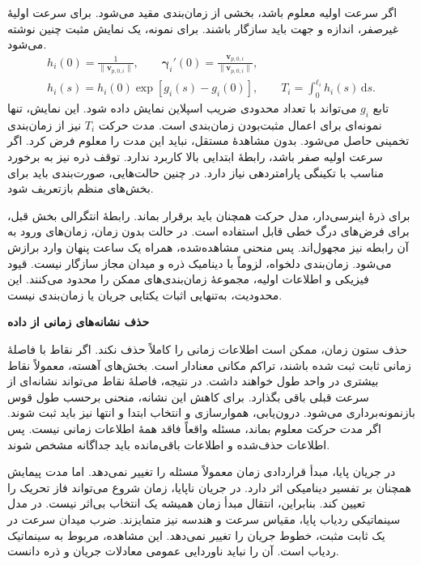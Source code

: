 اگر سرعت اولیه معلوم باشد، بخشی از زمان‌بندی مقید می‌شود.
برای سرعت اولیهٔ غیرصفر، اندازه و جهت باید سازگار باشند.
برای نمونه، یک نمایش مثبت چنین نوشته می‌شود.
\begin{equation}
\begin{gathered}
h_i(0)=\frac{1}{\|\mathbf v_{p,0,i}\|},\qquad
\boldsymbol\gamma_i'(0)=
\frac{\mathbf v_{p,0,i}}{\|\mathbf v_{p,0,i}\|},\\
h_i(s)=h_i(0)\exp\!\left[g_i(s)-g_i(0)\right],\qquad
T_i=\int_0^{\ell_i}h_i(s)\,\mathrm ds.
\end{gathered}
\label{eq:lit-untimed-positive-clock}
\end{equation}
تابع $g_i$ می‌تواند با تعداد محدودی ضریب اسپلاین نمایش داده شود.
این نمایش، تنها نمونه‌ای برای اعمال مثبت‌بودن زمان‌بندی است.
مدت حرکت $T_i$ نیز از زمان‌بندی تخمینی حاصل می‌شود.
بدون مشاهدهٔ مستقل، نباید این مدت را معلوم فرض کرد.
اگر سرعت اولیه صفر باشد، رابطهٔ ابتدایی بالا کاربرد ندارد.
توقف ذره نیز به برخورد مناسب با تکینگی پارامتردهی نیاز دارد.
در چنین حالت‌هایی، صورت‌بندی باید برای بخش‌های منظم بازتعریف شود.

برای ذرهٔ اینرسی‌دار، مدل حرکت همچنان باید برقرار بماند.
رابطهٔ انتگرالی بخش قبل، برای فرض‌های درگ خطی قابل استفاده است.
در حالت بدون زمان، زمان‌های ورود به آن رابطه نیز مجهول‌اند.
پس منحنی مشاهده‌شده، همراه یک ساعت پنهان وارد برازش می‌شود.
زمان‌بندی دلخواه، لزوماً با دینامیک ذره و میدان مجاز سازگار نیست.
قیود فیزیکی و اطلاعات اولیه، مجموعهٔ زمان‌بندی‌های ممکن را محدود می‌کنند.
این محدودیت، به‌تنهایی اثبات یکتایی جریان یا زمان‌بندی نیست.

\textbf{حذف نشانه‌های زمانی از داده}

حذف ستون زمان، ممکن است اطلاعات زمانی را کاملاً حذف نکند.
اگر نقاط با فاصلهٔ زمانی ثابت ثبت شده باشند، تراکم مکانی معنادار است.
بخش‌های آهسته، معمولاً نقاط بیشتری در واحد طول خواهند داشت.
در نتیجه، فاصلهٔ نقاط می‌تواند نشانه‌ای از سرعت قبلی باقی بگذارد.
برای کاهش این نشانه، منحنی برحسب طول قوس بازنمونه‌برداری می‌شود.
درون‌یابی، هموارسازی و انتخاب ابتدا و انتها نیز باید ثبت شوند.
اگر مدت حرکت معلوم بماند، مسئله واقعاً فاقد همهٔ اطلاعات زمانی نیست.
پس اطلاعات حذف‌شده و اطلاعات باقی‌مانده باید جداگانه مشخص شوند.

در جریان پایا، مبدأ قراردادی زمان معمولاً مسئله را تغییر نمی‌دهد.
اما مدت پیمایش همچنان بر تفسیر دینامیکی اثر دارد.
در جریان ناپایا، زمان شروع می‌تواند فاز تحریک را تعیین کند.
بنابراین، انتقال مبدأ زمان همیشه یک انتخاب بی‌اثر نیست.
در مدل سینماتیکی ردیاب پایا، مقیاس سرعت و هندسه نیز متمایزند.
ضرب میدان سرعت در یک ثابت مثبت، خطوط جریان را تغییر نمی‌دهد.
این مشاهده، مربوط به سینماتیک ردیاب است.
آن را نباید ناوردایی عمومی معادلات جریان و ذره دانست.

